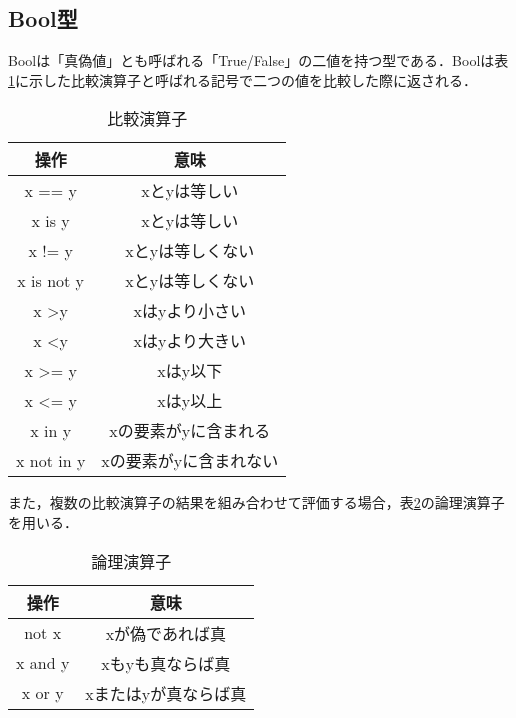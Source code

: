 \subsection{Bool型}
Boolは「真偽値」とも呼ばれる「True/False」の二値を持つ型である．Boolは表\ref{comparative_operator}に示した比較演算子と呼ばれる記号で二つの値を比較した際に返される．
\begin{table}[h]
 \centering
   \caption{比較演算子}
    \begin{tabular}{|c|c|} \hline
     操作 & 意味 \\ \hline \hline
     x == y & xとyは等しい \\ \hline
     x is y & xとyは等しい \\ \hline
     x != y & xとyは等しくない \\ \hline
     x is not y & xとyは等しくない \\ \hline
     x \textgreater y & xはyより小さい \\ \hline
     x \textless y & xはyより大きい \\ \hline
     x \textgreater= y & xはy以下 \\ \hline
     x \textless= y & xはy以上 \\ \hline
     x in y & xの要素がyに含まれる \\ \hline
     x not in y & xの要素がyに含まれない \\ \hline
    \end{tabular}
   \label{comparative_operator}
\end{table}

また，複数の比較演算子の結果を組み合わせて評価する場合，表\ref{logical_operator}の論理演算子を用いる．
\begin{table}[h]
 \centering
  \caption{論理演算子}
   \begin{tabular}{|c|c|} \hline
   操作 & 意味 \\ \hline \hline
   not x & xが偽であれば真 \\ \hline
   x and y & xもyも真ならば真 \\ \hline
   x or y & xまたはyが真ならば真 \\ \hline
   \end{tabular}
  \label{logical_operator}
\end{table}


